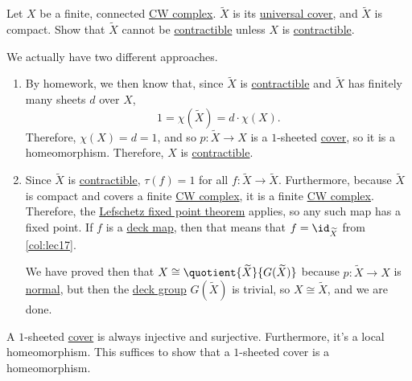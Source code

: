 \begin{eg}[QR May 2016]
	Let \(X\) be a finite, connected \hyperref[def:CW-Complex]{CW complex}. \(\widetilde{X}\) is its \hyperref[def:universal-covering]{universal cover},
	and \(\widetilde{X}\) is compact. Show that \(\widetilde{X}\) cannot be \hyperref[def:contractible]{contractible} unless \(X\) is \hyperref[def:contractible]{contractible}.
\end{eg}
\begin{explanation}
	We actually have two different approaches.
	\begin{enumerate}
		\item By homework, we then know that, since \(\widetilde{X}\) is \hyperref[def:contractible]{contractible} and \(\widetilde{X}\)
		      has finitely many sheets \(d\) over \(X\),
		      \[
			      1 = \chi(\widetilde{X}) = d \cdot \chi(X).
		      \]
		      Therefore, \(\chi(X) = d = 1\), and so \(p \colon \widetilde{X} \to X\) is a \(1\)-sheeted \hyperref[def:covering-map]{cover}, so
		      it is a homeomorphism. Therefore, \(X\) is \hyperref[def:contractible]{contractible}.
		\item Since \(\widetilde{X}\) is \hyperref[def:contractible]{contractible}, \(\tau(f) = 1\) for all \(f \colon \widetilde{X} \to \widetilde{X}\).
		      Furthermore, because \(\widetilde{X}\) is compact and covers a finite \hyperref[def:CW-Complex]{CW complex}, it is a finite \hyperref[def:CW-Complex]{CW complex}.
		      Therefore, the \hyperref[thm:Lefschetz-fixed-point]{Lefschetz fixed point theorem} applies, so any such map has a fixed point. If \(f\) is a
		      \hyperref[def:deck-transformation]{deck map}, then that means that \(f = \id_{\widetilde{X}}\) from \autoref{col:lec17}.

		      We have proved then that \(X \cong \quotient{\widetilde{X}}{G(\widetilde{X})}\) because \(p \colon \widetilde{X} \to X\) is \hyperref[def:normal-cover]{normal},
		      but then the \hyperref[def:deck-transformation]{deck group} \(G(\widetilde{X})\) is trivial, so \(X \cong \widetilde{X}\), and we are done.
	\end{enumerate}
\end{explanation}
\begin{exercise}
	A \(1\)-sheeted \hyperref[def:covering-map]{cover} is always injective and surjective. Furthermore, it's a local homeomorphism.
	This suffices to show that a \(1\)-sheeted cover is a homeomorphism.
\end{exercise}

